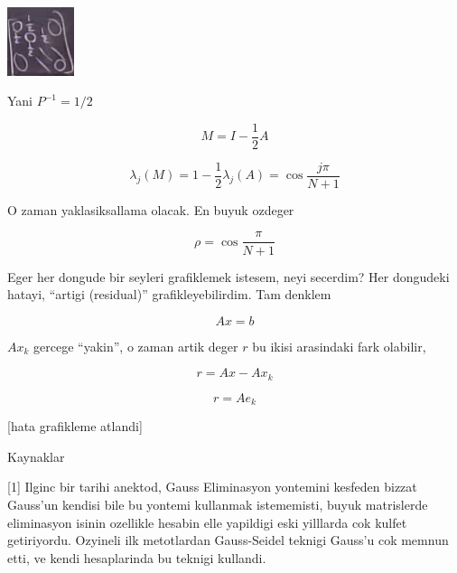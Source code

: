 \documentclass[12pt,fleqn]{article}\usepackage{../common}
\begin{document}
\includegraphics[height=2cm]{15_1.png}

Yani $P^{-1} = 1/2$

\[ M = I-\frac{ 1}{2}A  \]

\[ \lambda_j(M) = 1 - \frac{ 1}{2}\lambda_j(A) = \cos \frac{ j\pi}{N+1}\]

O zaman yaklasiksallama olacak. En buyuk ozdeger

\[ \rho = \cos \frac{ \pi}{N+1} \]

Eger her dongude bir seyleri grafiklemek istesem, neyi secerdim? Her
dongudeki hatayi, ``artigi (residual)'' grafikleyebilirdim. Tam denklem

\[ Ax = b \]

$Ax_k$ gercege ``yakin'', o zaman artik deger $r$ bu ikisi arasindaki fark
olabilir, 

\[ r = Ax - Ax_k \]

\[ r = Ae_k \]

[hata grafikleme atlandi]





Kaynaklar

[1] Ilginc bir tarihi anektod, Gauss Eliminasyon yontemini kesfeden bizzat
Gauss'un kendisi bile bu yontemi kullanmak istememisti, buyuk matrislerde
eliminasyon isinin ozellikle hesabin elle yapildigi eski yilllarda cok
kulfet getiriyordu. Ozyineli ilk metotlardan Gauss-Seidel teknigi Gauss'u
cok memnun etti, ve kendi hesaplarinda bu teknigi kullandi.
\end{document}
